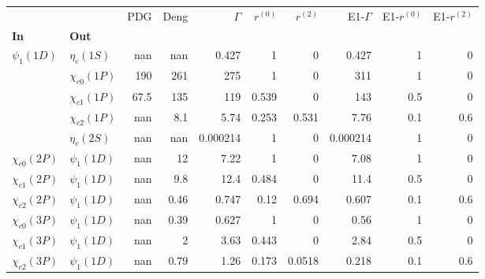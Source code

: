\begin{tabular}{l|l|r|r|r|r|r|r|r|r}
\toprule
                &                &  PDG &  Deng &  $\Gamma$ &  $r^{(0)}$ &  $r^{(2)}$ &  E1-$\Gamma$ &  E1-$r^{(0)}$ &  E1-$r^{(2)}$ \\
\textbf{In} & \textbf{Out} &      &       &           &            &            &              &               &               \\
\midrule
\textbf{$\psi_{1}(1D)$} & \textbf{$\eta_{c}(1S)$} &  nan &   nan &     0.427 &          1 &          0 &        0.427 &             1 &             0 \\
                & \textbf{$\chi_{c0}(1P)$} &  190 &   261 &       275 &          1 &          0 &          311 &             1 &             0 \\
                & \textbf{$\chi_{c1}(1P)$} & 67.5 &   135 &       119 &      0.539 &          0 &          143 &           0.5 &             0 \\
                & \textbf{$\chi_{c2}(1P)$} &  nan &   8.1 &      5.74 &      0.253 &      0.531 &         7.76 &           0.1 &           0.6 \\
                & \textbf{$\eta_{c}(2S)$} &  nan &   nan &  0.000214 &          1 &          0 &     0.000214 &             1 &             0 \\
\textbf{$\chi_{c0}(2P)$} & \textbf{$\psi_{1}(1D)$} &  nan &    12 &      7.22 &          1 &          0 &         7.08 &             1 &             0 \\
\textbf{$\chi_{c1}(2P)$} & \textbf{$\psi_{1}(1D)$} &  nan &   9.8 &      12.4 &      0.484 &          0 &         11.4 &           0.5 &             0 \\
\textbf{$\chi_{c2}(2P)$} & \textbf{$\psi_{1}(1D)$} &  nan &  0.46 &     0.747 &       0.12 &      0.694 &        0.607 &           0.1 &           0.6 \\
\textbf{$\chi_{c0}(3P)$} & \textbf{$\psi_{1}(1D)$} &  nan &  0.39 &     0.627 &          1 &          0 &         0.56 &             1 &             0 \\
\textbf{$\chi_{c1}(3P)$} & \textbf{$\psi_{1}(1D)$} &  nan &     2 &      3.63 &      0.443 &          0 &         2.84 &           0.5 &             0 \\
\textbf{$\chi_{c2}(3P)$} & \textbf{$\psi_{1}(1D)$} &  nan &  0.79 &      1.26 &      0.173 &     0.0518 &        0.218 &           0.1 &           0.6 \\
\bottomrule
\end{tabular}
